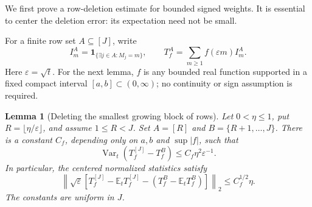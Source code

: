 \documentclass[11pt,letterpaper]{article}
\numberwithin{equation}{section}
\newtheorem{lemma}[theorem]{Lemma}
\theoremstyle{definition}\newtheorem{definition}[theorem]{Definition}
\theoremstyle{remark}\newtheorem{remark}[theorem]{Remark}
\newcommand{\E}{\mathbb E}
\newcommand{\eps}{\varepsilon}
\newcommand{\ind}{\mathbf 1}
\DeclareMathOperator{\Var}{Var}
\begin{document}
We first prove a row-deletion estimate for bounded signed weights.
It is essential to center the deletion error: its expectation need
not be small.

For a finite row set $A\subseteq[J]$, write
\[
 I_m^A=\ind_{\{\exists j\in A:M_j=m\}},\qquad
 T_f^A=\sum_{m\ge1}f(\eps m)I_m^A.
\]
Here $\eps=\sqrt t$. For the next lemma, $f$ is any bounded real
function supported in a fixed compact interval $[a,b]\subset(0,\infty)$;
no continuity or sign assumption is required.

\begin{lemma}[Deleting the smallest growing block of rows]
\label{dmv:fl:lem:small-row-deletion}
Let $0<\eta\le1$, put $R=\lfloor\eta/\eps\rfloor$, and assume
$1\le R<J$. Set $A=[R]$ and $B=\{R+1,\ldots,J\}$.
There is a constant $C_f$, depending only on $a,b$ and $\sup|f|$,
such that
\begin{equation}
 \Var_t\!\left(T_f^{[J]}-T_f^B\right)
 \le C_f\eta^2\eps^{-1}.
 \label{dmv:fl:eq:small-row-deletion-variance}
\end{equation}
In particular, the centered normalized statistics satisfy
\begin{equation}
 \left\|
 \sqrt\eps\left[
 T_f^{[J]}-\E_tT_f^{[J]}
 -(T_f^B-\E_tT_f^B)
 \right]\right\|_2
 \le C_f^{1/2}\eta.
 \label{dmv:fl:eq:small-row-deletion-Ltwo}
\end{equation}
The constants are uniform in $J$.
\end{lemma}
\end{document}
